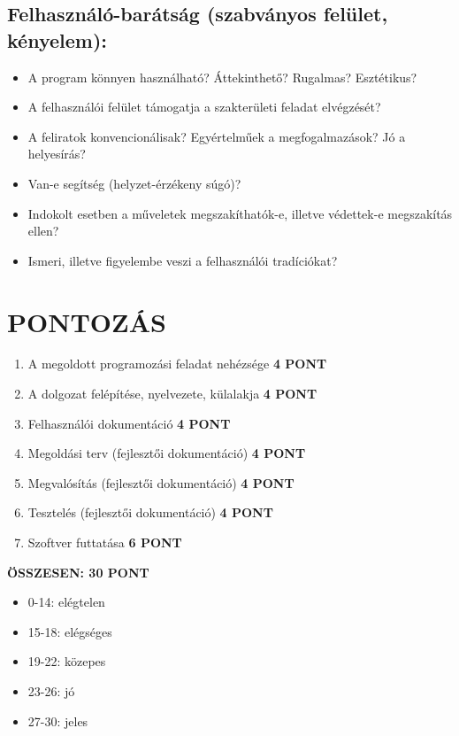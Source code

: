 \subsection{Felhasználó-barátság (szabványos felület, kényelem):}
\begin{itemize}
    \item A program könnyen használható? Áttekinthető? Rugalmas? Esztétikus?
    \item A felhasználói felület támogatja a szakterületi feladat elvégzését?
    \item A feliratok konvencionálisak? Egyértelműek a megfogalmazások? Jó a helyesírás?
    \item Van-e segítség (helyzet-érzékeny súgó)?
    \item Indokolt esetben a műveletek megszakíthatók-e, illetve védettek-e megszakítás ellen?
    \item Ismeri, illetve figyelembe veszi a felhasználói tradíciókat?
\end{itemize}


\section{PONTOZÁS}
\begin{enumerate}
	\item\label{step:first} A megoldott programozási feladat nehézsége {\bf 4 PONT}
	\item A dolgozat felépítése, nyelvezete, külalakja {\bf 4 PONT}
    \item Felhasználói dokumentáció {\bf 4 PONT}
    \item Megoldási terv (fejlesztői dokumentáció) {\bf 4 PONT}
    \item Megvalósítás (fejlesztői dokumentáció) {\bf 4 PONT}
    \item Tesztelés (fejlesztői dokumentáció) {\bf 4 PONT}
    \item Szoftver futtatása {\bf 6 PONT}
\end{enumerate}

{\bf ÖSSZESEN: 30 PONT}

\begin{itemize}
    \item  0-14: elégtelen
    \item 15-18: elégséges
    \item 19-22: közepes
    \item 23-26: jó
    \item 27-30: jeles
\end{itemize}

\noindent\makebox[\linewidth]{\rule{\paperwidth}{0.4pt}}
